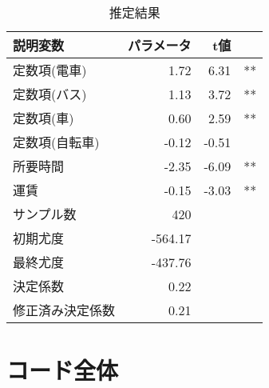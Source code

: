 \begin{table}
    \centering
    \caption{推定結果}
    \label{tab:est_result}
    \begin{tabular}{lrrl}
        \hline
        説明変数     & パラメータ   & t値         \\
        \hline
        定数項(電車)  & 1.72    & 6.31  & ** \\
        定数項(バス)  & 1.13    & 3.72  & ** \\
        定数項(車)   & 0.60    & 2.59  & ** \\
        定数項(自転車) & -0.12   & -0.51 &    \\
        所要時間     & -2.35   & -6.09 & ** \\
        運賃       & -0.15   & -3.03 & ** \\
        \hline
        サンプル数    & 420     &       &    \\
        初期尤度     & -564.17 &       &    \\
        最終尤度     & -437.76 &       &    \\
        決定係数     & 0.22    &       &    \\
        修正済み決定係数 & 0.21    &       &    \\
        \hline
    \end{tabular}
\end{table}

\section{コード全体}

